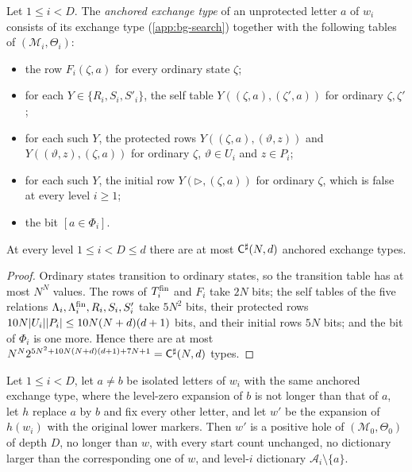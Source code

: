 \begin{definition}\label{def:mo-type}
Let $1\le i<D$. The \emph{anchored exchange type} of an unprotected letter $a$
of $w_i$ consists of its exchange type (\cref{app:bg-search}) together with
the following tables of $(\mathcal M_i,\Theta_i)$:
\begin{itemize}[leftmargin=*]
\item the row $F_i(\zeta,a)$ for every ordinary state $\zeta$;
\item for each $Y\in\{R_i,S_i,S'_i\}$, the self table $Y((\zeta,a),(\zeta',a))$
  for ordinary $\zeta,\zeta'$;
\item for each such $Y$, the protected rows $Y((\zeta,a),(\vartheta,z))$ and
  $Y((\vartheta,z),(\zeta,a))$ for ordinary $\zeta$, $\vartheta\in U_i$ and
  $z\in P_i$;
\item for each such $Y$, the initial row $Y(\triangleright,(\zeta,a))$ for
  ordinary $\zeta$, which is false at every level $i\ge1$;
\item the bit $[a\in\Phi_i]$.
\end{itemize}
\end{definition}

\begin{lemma}\label{lem:mo-types}
At every level $1\le i<D\le d$ there are at most $\mathsf{C}^{\sharp}(N,d)$ anchored
exchange types.
\end{lemma}

\begin{proof}
Ordinary states transition to ordinary states, so the transition table has at
most $N^N$ values. The rows of $T^{\mathrm{fin}}_i$ and $F_i$ take $2N$ bits; the self
tables of the five relations $\Lambda_i,\Lambda^{\mathrm{fin}}_i,R_i,S_i,S'_i$ take $5N^2$ bits,
their protected rows $10N\lvert U_i\rvert\lvert P_i\rvert\le10N(N+d)(d+1)$ bits, and their
initial rows $5N$ bits; and the bit of $\Phi_i$ is one more. Hence there are at
most $N^N2^{5N^2+10N(N+d)(d+1)+7N+1}=\mathsf{C}^{\sharp}(N,d)$ types.
\end{proof}

\begin{lemma}\label{lem:mo-exchange}
Let $1\le i<D$, let $a\ne b$ be isolated letters of $w_i$ with the same
anchored exchange type, where the level-zero expansion of $b$ is not longer
than that of $a$, let $h$ replace $a$ by $b$ and fix every other letter, and
let $w'$ be the expansion of $h(w_i)$ with the original lower markers. Then
$w'$ is a positive hole of $(\mathcal M_0,\Theta_0)$ of depth $D$, no longer
than $w$, with every start count unchanged, no dictionary larger than the
corresponding one of $w$, and level-$i$ dictionary $\mathcal A_i\setminus\{a\}$.
\end{lemma}

